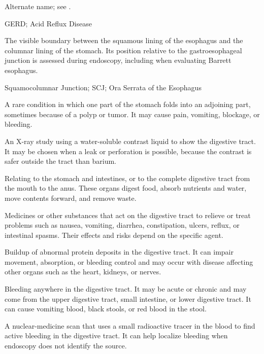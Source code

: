  Alternate name; see .

\synonyms
GERD; Acid Reflux Disease

 The visible boundary between the squamous lining of the esophagus and the columnar lining of the stomach. Its position relative to the gastroesophageal junction is assessed during endoscopy, including when evaluating Barrett esophagus.

\synonyms
Squamocolumnar Junction; SCJ; Ora Serrata of the Esophagus

 A rare condition in which one part of the stomach folds into an adjoining part, sometimes because of a polyp or tumor. It may cause pain, vomiting, blockage, or bleeding.

 An X-ray study using a water-soluble contrast liquid to show the digestive tract. It may be chosen when a leak or perforation is possible, because the contrast is safer outside the tract than barium.

 Relating to the stomach and intestines, or to the complete digestive tract from the mouth to the anus. These organs digest food, absorb nutrients and water, move contents forward, and remove waste.

 Medicines or other substances that act on the digestive tract to relieve or treat problems such as nausea, vomiting, diarrhea, constipation, ulcers, reflux, or intestinal spasms. Their effects and risks depend on the specific agent.

 Buildup of abnormal protein deposits in the digestive tract. It can impair movement, absorption, or bleeding control and may occur with disease affecting other organs such as the heart, kidneys, or nerves.

 Bleeding anywhere in the digestive tract. It may be acute or chronic and may come from the upper digestive tract, small intestine, or lower digestive tract. It can cause vomiting blood, black stools, or red blood in the stool.

 A nuclear-medicine scan that uses a small radioactive tracer in the blood to find active bleeding in the digestive tract. It can help localize bleeding when endoscopy does not identify the source.

